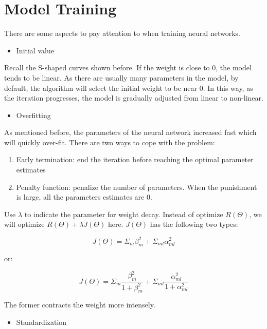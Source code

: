 \documentclass[]{book}
\providecommand{\tightlist}{%
  \setlength{\itemsep}{0pt}\setlength{\parskip}{0pt}}
\theoremstyle{definition}
\theoremstyle{definition}
\theoremstyle{remark}
\begin{document}
\section{Model Training}\label{model-training}

There are some aspects to pay attention to when training neural
networks.

\begin{itemize}
\tightlist
\item
  Initial value
\end{itemize}

Recall the S-shaped curves shown before. If the weight is close to 0,
the model tends to be linear. As there are usually many parameters in
the model, by default, the algorithm will select the initial weight to
be near 0. In this way, as the iteration progresses, the model is
gradually adjusted from linear to non-linear.

\begin{itemize}
\tightlist
\item
  Overfitting
\end{itemize}

As mentioned before, the parameters of the neural network increased fast
which will quickly over-fit. There are two ways to cope with the
problem:

\begin{enumerate}
\def\labelenumi{(\arabic{enumi})}
\tightlist
\item
  Early termination: end the iteration before reaching the optimal
  parameter estimates
\item
  Penalty function: penalize the number of parameters. When the
  punishment is large, all the parameters estimates are 0.
\end{enumerate}

Use \(\lambda\) to indicate the parameter for weight decay. Instead of
optimize \(R(\Theta)\), we will optimize \(R(\Theta)+\lambda J(\Theta)\)
here. \(J(\Theta)\) has the following two types:

\[J(\Theta)=\Sigma_{m}\beta_{m}^{2}+\Sigma_{ml}\alpha_{ml}^{2}\]

or:

\[J(\Theta)=\Sigma_{m}\frac{\beta_{m}^{2}}{1+\beta_{m}^{2}}+\Sigma_{ml}\frac{\alpha_{ml}^{2}}{1+\alpha_{ml}^{2}}\]

The former contracts the weight more intensely.

\begin{itemize}
\tightlist
\item
  Standardization
\end{itemize}
\end{document}
